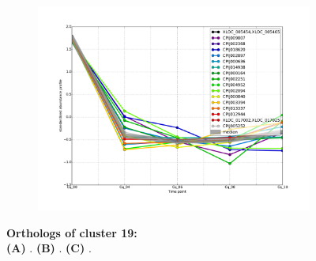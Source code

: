 \begin{figure}[hp]
\begin{subfigure}[t]{.5\linewidth}
\includegraphics[width=\linewidth]{figures/figs/ecr_and_insects_ptci_20130903/downAt4_gene_profiles_from_cummerbund/Cq_downAt4_cls19_Ag_target_FPKMs_vb_orthos.pdf}
\caption{}
\label{fig:cluster19-Cq}
\end{subfigure}
% 
\caption[Orthologs of cluster 19]{\sf \textbf{Orthologs of cluster 19:}\\

\textbf{(A)} \Aa.
\textbf{(B)} \Ag.
\textbf{(C)} \Cq.
}
\label{fig:cluster19}
\end{figure}